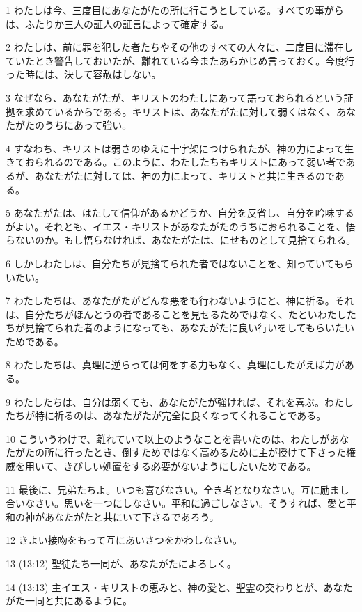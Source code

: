 \par 1 わたしは今、三度目にあなたがたの所に行こうとしている。すべての事がらは、ふたりか三人の証人の証言によって確定する。
\par 2 わたしは、前に罪を犯した者たちやその他のすべての人々に、二度目に滞在していたとき警告しておいたが、離れている今またあらかじめ言っておく。今度行った時には、決して容赦はしない。
\par 3 なぜなら、あなたがたが、キリストのわたしにあって語っておられるという証拠を求めているからである。キリストは、あなたがたに対して弱くはなく、あなたがたのうちにあって強い。
\par 4 すなわち、キリストは弱さのゆえに十字架につけられたが、神の力によって生きておられるのである。このように、わたしたちもキリストにあって弱い者であるが、あなたがたに対しては、神の力によって、キリストと共に生きるのである。
\par 5 あなたがたは、はたして信仰があるかどうか、自分を反省し、自分を吟味するがよい。それとも、イエス・キリストがあなたがたのうちにおられることを、悟らないのか。もし悟らなければ、あなたがたは、にせものとして見捨てられる。
\par 6 しかしわたしは、自分たちが見捨てられた者ではないことを、知っていてもらいたい。
\par 7 わたしたちは、あなたがたがどんな悪をも行わないようにと、神に祈る。それは、自分たちがほんとうの者であることを見せるためではなく、たといわたしたちが見捨てられた者のようになっても、あなたがたに良い行いをしてもらいたいためである。
\par 8 わたしたちは、真理に逆らっては何をする力もなく、真理にしたがえば力がある。
\par 9 わたしたちは、自分は弱くても、あなたがたが強ければ、それを喜ぶ。わたしたちが特に祈るのは、あなたがたが完全に良くなってくれることである。
\par 10 こういうわけで、離れていて以上のようなことを書いたのは、わたしがあなたがたの所に行ったとき、倒すためではなく高めるために主が授けて下さった権威を用いて、きびしい処置をする必要がないようにしたいためである。
\par 11 最後に、兄弟たちよ。いつも喜びなさい。全き者となりなさい。互に励まし合いなさい。思いを一つにしなさい。平和に過ごしなさい。そうすれば、愛と平和の神があなたがたと共にいて下さるであろう。
\par 12 きよい接吻をもって互にあいさつをかわしなさい。
\par 13 (13:12) 聖徒たち一同が、あなたがたによろしく。
\par 14 (13:13) 主イエス・キリストの恵みと、神の愛と、聖霊の交わりとが、あなたがた一同と共にあるように。


